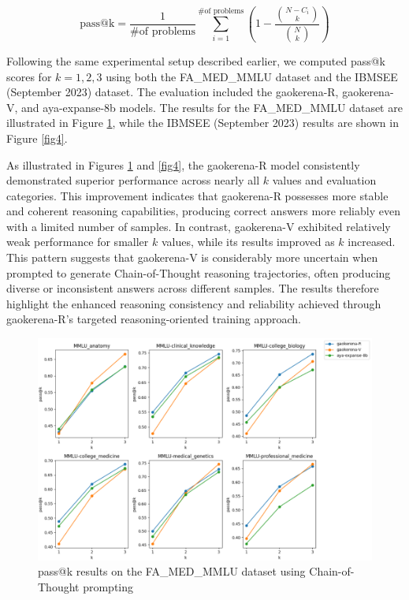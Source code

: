 \documentclass[conference]{IEEEtran}
\begin{document}
\begin{equation}
\text{pass@k} = \frac{1}{\text{\# of problems}} \sum_{i=1}^{\text{\# of problems}} \left( 1 -  \frac{\binom{N - C_i}{k}}{\binom{N}{k}} \right)
\end{equation}

Following the same experimental setup described earlier, we computed pass@k scores for \(k = 1, 2, 3\) using both the FA\_MED\_MMLU dataset and the IBMSEE (September 2023) dataset. The evaluation included the gaokerena-R, gaokerena-V, and aya-expanse-8b models. The results for the FA\_MED\_MMLU dataset are illustrated in Figure
\ref{fig3}, while the IBMSEE (September 2023) results are shown in Figure
\ref{fig4}.

As illustrated in Figures
\ref{fig3} and
\ref{fig4}, the gaokerena-R model consistently demonstrated superior performance across nearly all \(k\) values and evaluation categories. This improvement indicates that gaokerena-R possesses more stable and coherent reasoning capabilities, producing correct answers more reliably even with a limited number of samples. In contrast, gaokerena-V exhibited relatively weak performance for smaller \(k\) values, while its results improved as \(k\) increased. This pattern suggests that gaokerena-V is considerably more uncertain when prompted to generate Chain-of-Thought reasoning trajectories, often producing diverse or inconsistent answers across different samples. The results therefore highlight the enhanced reasoning consistency and reliability achieved through gaokerena-R’s targeted reasoning-oriented training approach.


\begin{figure}[h]
    \centering
    \includegraphics[width=1.0\linewidth]{fig3.png}
    \caption{pass@k results on the FA\_MED\_MMLU dataset using Chain-of-Thought prompting}
    \label{fig3}
\end{figure}
\end{document}
